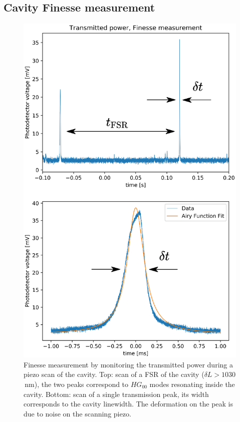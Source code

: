\subsection{Cavity Finesse measurement}
\begin{figure}
	\centering
	\includegraphics[width=0.9\linewidth]{images/FSRfinesse.eps}
	\caption{Finesse measurement by monitoring the transmitted power during a piezo scan of the cavity. Top: scan of a FSR of the cavity ($\delta L > 1030$\,nm), the two peaks correspond to $HG_{00}$ modes resonating inside the cavity. Bottom: scan of a single transmission peak, its width corresponds to the cavity linewidth. The deformation on the peak is due to noise on the scanning piezo.}
	\label{fig:FSRfinesse}
\end{figure}
